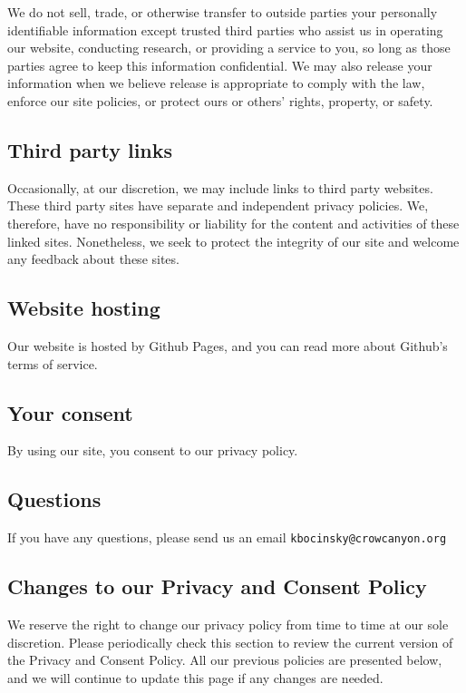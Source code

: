 \documentclass[12pt,]{krantz}
\theoremstyle{definition}
\theoremstyle{definition}
\theoremstyle{definition}
\theoremstyle{remark}
\begin{document}
We do not sell, trade, or otherwise transfer to outside parties your
personally identifiable information except trusted third parties who
assist us in operating our website, conducting research, or providing a
service to you, so long as those parties agree to keep this information
confidential. We may also release your information when we believe
release is appropriate to comply with the law, enforce our site
policies, or protect ours or others' rights, property, or safety.

\hypertarget{third-party-links}{%
\subsection*{Third party links}\label{third-party-links}}


Occasionally, at our discretion, we may include links to third party
websites. These third party sites have separate and independent privacy
policies. We, therefore, have no responsibility or liability for the
content and activities of these linked sites. Nonetheless, we seek to
protect the integrity of our site and welcome any feedback about these
sites.

\hypertarget{website-hosting}{%
\subsection*{Website hosting}\label{website-hosting}}


Our website is hosted by Github Pages, and you can read more about
Github's terms of service.

\hypertarget{your-consent}{%
\subsection*{Your consent}\label{your-consent}}


By using our site, you consent to our privacy policy.

\hypertarget{questions}{%
\subsection*{Questions}\label{questions}}


If you have any questions, please send us an email
\texttt{kbocinsky@crowcanyon.org}

\hypertarget{changes-to-our-privacy-and-consent-policy}{%
\subsection*{Changes to our Privacy and Consent
Policy}\label{changes-to-our-privacy-and-consent-policy}}

We reserve the right to change our privacy policy from time to time at
our sole discretion. Please periodically check this section to review
the current version of the Privacy and Consent Policy. All our previous
policies are presented below, and we will continue to update this page
if any changes are needed.



\backmatter
\printindex
\end{document}
